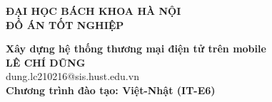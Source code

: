 \documentclass[DoAn.tex]{subfiles}
\begin{document}
\begin{titlepage}
\thispagestyle{empty}
\begin{center}

{\textbf{\large{ĐẠI HỌC BÁCH KHOA HÀ NỘI}}}\\[4cm]

{\textbf{\huge{ ĐỒ ÁN TỐT NGHIỆP}}}\\[1cm]
{\textbf{\Large{Xây dựng hệ thống thương mại điện tử trên mobile}}\\[1cm]

{\textbf{\large{LÊ CHÍ DŨNG}}}\\
{\large{dung.lc210216@sis.hust.edu.vn}}\\[0.5cm]

{\textbf{\large{Chương trình đào tạo: Việt-Nhật (IT-E6)
}}}\\

\vspace{2cm}
\begin{table}[H]
\centering
{}
\end{table}}
\end{center}



\end{titlepage}
\end{document}
